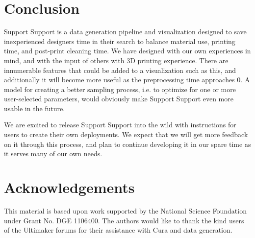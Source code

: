 \documentclass{sigchi}
\begin{document}
\section{Conclusion}
Support Support is a data generation pipeline and visualization designed to save inexperienced designers time in their search to balance material use, printing time, and post-print cleaning time.  We have designed with our own experiences in mind, and with the input of others with 3D printing experience.  There are innumerable features that could be added to a visualization such as this, and additionally it will become more useful as the preprocessing time approaches 0.  A model for creating a better sampling process, i.e. to optimize for one or more user-selected parameters, would obviously make Support Support even more usable in the future.

We are excited to release Support Support into the wild with instructions for users to create their own deployments.  We expect that we will get more feedback on it through this process, and plan to continue developing it in our spare time as it serves many of our own needs.

\section{Acknowledgements}
This material is based upon work supported by the National Science Foundation under Grant No. DGE 1106400.  The authors would like to thank the kind users of the Ultimaker forums for their assistance with Cura and data generation.

\balance

\small

\end{document}

